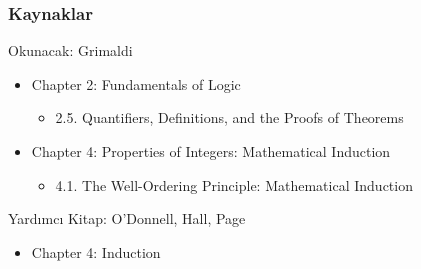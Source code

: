 \documentclass[dvipsnames]{beamer}
\theoremstyle{definition}
\theoremstyle{example}
\theoremstyle{plain}
\begin{document}
\begin{frame}
  \frametitle{Kaynaklar}

  \begin{block}{Okunacak: Grimaldi}
    \begin{itemize}
      \item Chapter 2: Fundamentals of Logic
      \begin{itemize}
        \item 2.5. \alert{Quantifiers, Definitions, and the Proofs of Theorems}
      \end{itemize}

      \item Chapter 4: Properties of Integers: Mathematical Induction
      \begin{itemize}
        \item 4.1. \alert{The Well-Ordering Principle: Mathematical Induction}
      \end{itemize}
    \end{itemize}
  \end{block}

  \begin{block}{Yardımcı Kitap: O'Donnell, Hall, Page}
    \begin{itemize}
      \item Chapter 4: Induction
    \end{itemize}
  \end{block}
\end{frame}
\end{document}

